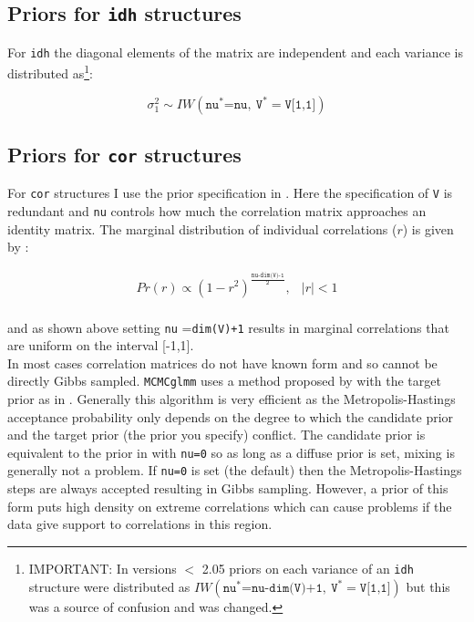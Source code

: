 \documentclass{article}
\begin{document}
\subsection{Priors for \texttt{idh} structures}

For \texttt{idh} the diagonal elements of the matrix are independent and each variance is distributed as\footnote{IMPORTANT: In versions $<$ 2.05 priors on each variance of an \texttt{idh} structure were distributed as $IW\left(\texttt{nu}^{\ast}\texttt{=nu-dim(V)+1},\ \texttt{V}^{\ast}=\texttt{V[1,1]}\right)$ but this was a source of confusion and was changed.}:

\begin{displaymath}
\sigma^{2}_{1} \sim IW\left(\texttt{nu}^{\ast}\texttt{=nu},\ \texttt{V}^{\ast}=\texttt{V[1,1]}\right)
\end{displaymath}


\subsection{Priors for \texttt{cor} structures}

For \texttt{cor} structures I use the prior specification in \citet{Barnard.2000}. Here the specification of \texttt{V} is redundant and \texttt{nu} controls how much the correlation matrix approaches an identity matrix.  The marginal distribution of individual correlations ($r$) is given by \citet{Barnard.2000}   \citep[and][]{Box.1973}:

\begin{equation}
\begin{array}{lr}
Pr(r) \propto (1-r^{2})^\frac{\texttt{nu-dim(V)-1}}{\texttt{2}}, & |r|<1\\
\end{array}
\end{equation}

and as shown above setting \texttt{nu} =\texttt{dim(V)+1} results in marginal correlations that are uniform on the interval [-1,1].\\

In most cases correlation matrices do not have known form and so cannot be directly Gibbs sampled. \texttt{MCMCglmm} uses a method proposed by \citet{Liu.2006} with the target prior as in \citet{Barnard.2000}.  Generally this algorithm is very efficient as the Metropolis-Hastings acceptance probability only depends on the degree to which the candidate prior  and the target prior (the prior you specify) conflict. The candidate prior is equivalent to the prior  in \citet{Barnard.2000} with \texttt{nu=0} so as long as a diffuse prior is set, mixing is generally not a problem. If  \texttt{nu=0} is set (the default) then the Metropolis-Hastings steps are always accepted resulting in Gibbs sampling. However, a prior of this form puts high density on extreme correlations which can cause problems if the data give support to correlations in this region.\\ 

\label{VCVprior-sec}
\ifalone
\end{document}
